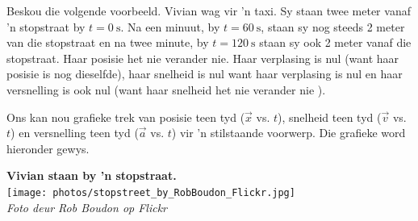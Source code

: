 \begin{minipage}{.5\textwidth}
Beskou die volgende voorbeeld. Vivian wag vir 'n taxi. Sy staan twee meter vanaf 'n stopstraat by $t=0~\text{s}$. Na een minuut, by $t=60~\text{s}$, staan sy nog steeds 2 meter van die stopstraat en na twee minute, by $t=120~\text{s}$ staan sy ook  2 meter vanaf die stopstraat. Haar posisie het nie verander nie. Haar verplasing is nul (want haar posisie is nog dieselfde), haar snelheid is nul want haar verplasing is nul en haar versnelling is ook nul (want haar snelheid het nie verander nie ).

Ons kan nou grafieke trek van posisie teen tyd ($\vec{x}$ vs. $t$), snelheid teen tyd ($\vec{v}$ vs. $t$) en versnelling teen tyd ($\vec{a}$ vs. $t$) vir 'n stilstaande voorwerp. Die grafieke word hieronder gewys.
\end{minipage}
\begin{minipage}{.5\textwidth}
\begin{center}
 \textbf{Vivian staan by 'n stopstraat.}\\
\texttt{[image: photos/stopstreet\_by\_RobBoudon\_Flickr.jpg]}\\
\textit{Foto deur Rob Boudon op Flickr}
\end{center}
\end{minipage}



